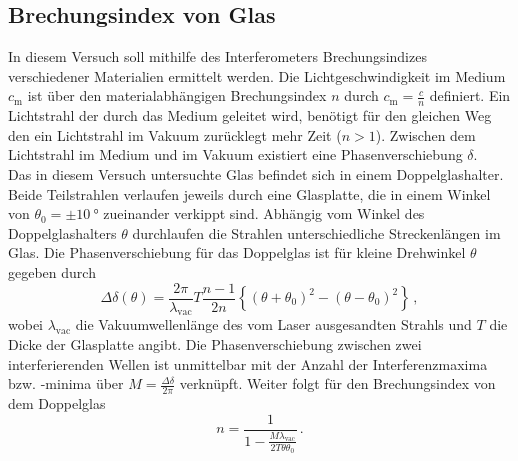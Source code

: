 \subsection{Brechungsindex von Glas}
In diesem Versuch soll mithilfe des Interferometers Brechungsindizes verschiedener Materialien ermittelt werden.
Die Lichtgeschwindigkeit im Medium $c_\text{m}$ ist über den materialabhängigen Brechungsindex $n$ durch $c_\text{m} = \frac{c}{n}$ definiert.
Ein Lichtstrahl der durch das Medium geleitet wird, benötigt für den gleichen Weg den ein Lichtstrahl im Vakuum zurücklegt mehr Zeit ($n>1$).
Zwischen dem Lichtstrahl im Medium und im Vakuum existiert eine Phasenverschiebung $\delta$.
\\
Das in diesem Versuch untersuchte Glas befindet sich in einem Doppelglashalter.
Beide Teilstrahlen verlaufen jeweils durch eine Glasplatte, die in einem Winkel von $\theta_0 = \pm \qty{10}{\degree}$ zueinander verkippt sind.
Abhängig vom Winkel des Doppelglashalters $\theta$ durchlaufen die Strahlen unterschiedliche Streckenlängen im Glas.
Die Phasenverschiebung für das Doppelglas ist für kleine Drehwinkel $\theta$ gegeben durch
\begin{equation*}
    \Delta \delta (\theta) = \frac{2\pi}{\lambda_\text{vac}} T \frac{n-1}{2n} \left \{ (\theta+\theta_0)^2 - (\theta-\theta_0)^2 \right \} \, ,
\end{equation*}
wobei $\lambda_\text{vac}$ die Vakuumwellenlänge des vom Laser ausgesandten Strahls und $T$ die Dicke der Glasplatte angibt.
Die Phasenverschiebung zwischen zwei interferierenden Wellen ist unmittelbar mit der Anzahl der Interferenzmaxima bzw. -minima über $M = \frac{\Delta \delta}{2\pi}$ verknüpft.
Weiter folgt für den Brechungsindex von dem Doppelglas
\begin{equation}
    n = \frac{1}{1- \frac{M \lambda_\text{vac}}{2 T \theta \theta_0}} \, .
    \label{eq:n_glas}
\end{equation}

